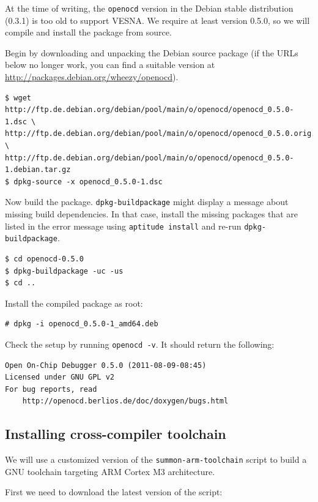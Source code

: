 \documentclass[a4paper, 10pt]{article}
\begin{document}
At the time of writing, the \verb|openocd| version in the Debian stable
distribution (0.3.1) is too old to support VESNA. We require at least version 0.5.0, so
we will compile and install the package from source.

Begin by downloading and unpacking the Debian source package (if the URLs below
no longer work, you can find a suitable version at
\url{http://packages.debian.org/wheezy/openocd}).

\begin{verbatim}
$ wget http://ftp.de.debian.org/debian/pool/main/o/openocd/openocd_0.5.0-1.dsc \
http://ftp.de.debian.org/debian/pool/main/o/openocd/openocd_0.5.0.orig.tar.bz2 \
http://ftp.de.debian.org/debian/pool/main/o/openocd/openocd_0.5.0-1.debian.tar.gz
$ dpkg-source -x openocd_0.5.0-1.dsc
\end{verbatim}

Now build the package. \verb|dpkg-buildpackage| might display a message about
missing build dependencies. In that case, install the missing packages that are
listed in the error message using \verb|aptitude install| and re-run
\verb|dpkg-buildpackage|.

\begin{verbatim}
$ cd openocd-0.5.0
$ dpkg-buildpackage -uc -us
$ cd ..
\end{verbatim}

Install the compiled package as root:

\begin{verbatim}
# dpkg -i openocd_0.5.0-1_amd64.deb
\end{verbatim}

Check the setup by running \verb|openocd -v|. It should return the following:

\begin{verbatim}
Open On-Chip Debugger 0.5.0 (2011-08-09-08:45)
Licensed under GNU GPL v2
For bug reports, read
	http://openocd.berlios.de/doc/doxygen/bugs.html
\end{verbatim}

\subsection{Installing cross-compiler toolchain}

We will use a customized version of the \verb|summon-arm-toolchain| script to
build a GNU toolchain targeting ARM Cortex M3 architecture.

First we need to download the latest version of the script:
\end{document}
